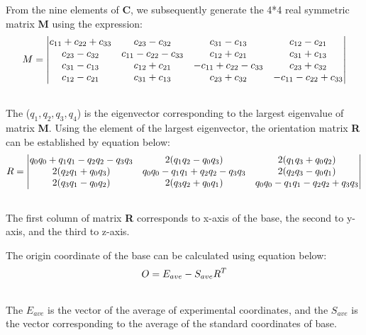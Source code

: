 \documentclass[letterpaper,10pt,english]{sphinxmanual}
\begin{document}
From the nine elements of \textbf{C}, we subsequently generate the 4*4 real symmetric matrix \textbf{M} using the expression:
\begin{gather}
\begin{split}M=
\begin{vmatrix}
c_{11}+c_{22}+c_{33} & c_{23}-c_{32}         &  c_{31}-c_{13}        & c_{12}-c_{21} \\
c_{23}-c_{32}        & c_{11}-c_{22}-c_{33}  &  c_{12}+c_{21}        & c_{31}+c_{13} \\
c_{31}-c_{13}        & c_{12}+c_{21}         & -c_{11}+c_{22}-c_{33} & c_{23}+c_{32} \\
c_{12}-c_{21}        & c_{31}+c_{13}         &  c_{23}+c_{32}        & -c_{11}-c_{22}+c_{33} \\
\end{vmatrix}\end{split}\notag\\\begin{split}\end{split}\notag
\end{gather}
The ($q_1,q_2,q_3,q_4$) is the eigenvector corresponding to the largest eigenvalue of matrix \textbf{M}. Using the element of the largest eigenvector, the orientation matrix \textbf{R} can be established by equation below:
\begin{gather}
\begin{split}R=
\begin{vmatrix}
q_0q_0+q_1q_1-q_2q_2-q_3q_3  &  2(q_1q_2 - q_0q_3)           & 2(q_1q_3+q_0q_2) \\
2(q_2q_1+q_0q_3)             &  q_0q_0-q_1q_1+q_2q_2-q_3q_3  & 2(q_2q_3-q_0q_1) \\
2(q_3q_1-q_0q_2)             &  2(q_3q_2 + q_0q_1)           & q_0q_0-q_1q_1- q_2q_2+q_3q_3 \\
\end{vmatrix}\end{split}\notag\\\begin{split}\end{split}\notag
\end{gather}
The first column of matrix \textbf{R} corresponds to x-axis of the base, the second to y-axis, and the third to z-axis.

The origin coordinate of the base can be calculated using equation below:
\begin{gather}
\begin{split}O=E_{ave}-S_{ave}R^{T}\end{split}\notag\\\begin{split}\end{split}\notag
\end{gather}
The $E_{ave}$ is the vector of the average of experimental coordinates,
and the $S_{ave}$ is the vector corresponding to the average of the standard coordinates of base.
\end{document}

